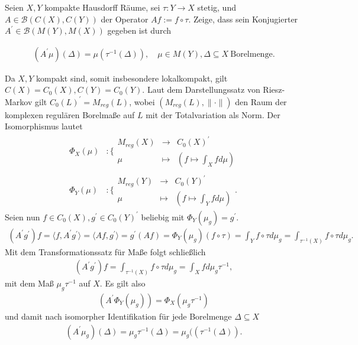 \begin{exercise}

Seien $X, Y$ kompakte Hausdorff Räume, sei $\tau: Y \to X$ stetig, und $A \in \mathcal{B}(C(X), C(Y))$ der Operator $A f := f \circ \tau$.
Zeige, dass sein Konjugierter $A^\prime \in \mathcal{B}(M(Y), M(X))$ gegeben ist durch

\begin{align*}
  (A^\prime \mu)(\Delta) = \mu(\tau^{-1}(\Delta)),
  \quad
  \mu \in M(Y), \Delta \subseteq X ~\text{Borelmenge}.
\end{align*}

\end{exercise}

\begin{solution}
Da $X,Y$ kompakt sind, somit insbesondere lokalkompakt, gilt $C(X) = C_0(X), C(Y) = C_0(Y)$.
Laut dem Darstellungssatz von Riesz-Markov gilt $C_0(L)^{\prime} = M_{reg}(L)$,
wobei $(M_{reg}(L), \|\cdot\|)$ den Raum der komplexen regulären Borelmaße auf $L$
mit der Totalvariation als Norm.
Der Isomorphismus lautet
\begin{align*}
  \Phi_X(\mu)&: \Bigg\{ \begin{matrix}
    M_{reg}(X) & \to & C_0(X)^{\prime} \\
    \mu & \mapsto & (f \mapsto \int_X f d\mu)
  \end{matrix} \\
  \Phi_Y(\mu)&: \Bigg\{ \begin{matrix}
    M_{reg}(Y) & \to & C_0(Y)^{\prime} \\
    \mu & \mapsto & (f \mapsto \int_Y f d\mu)
  \end{matrix}.
\end{align*}
Seien nun $f \in C_0(X), g^{\prime} \in C_0(Y)^{\prime}$ beliebig mit $\Phi_Y(\mu_g) = g^{\prime}$.
\begin{align*}
  (A^{\prime}g^{\prime})f = \langle f, A^{\prime}g^{\prime} \rangle = \langle A f, g^{\prime} \rangle
  = g^{\prime}(Af) = \Phi_Y(\mu_g)(f \circ \tau)
  = \int_Y f\circ \tau d\mu_g
  = \int_{\tau^{-1}(X)} f \circ \tau d\mu_g.
\end{align*}
Mit dem Transformationssatz für Maße folgt schließlich
\begin{align*}
  (A^{\prime}g^{\prime})f = \int_{\tau^{-1}(X)} f \circ \tau d\mu_g
  = \int_{X} f d\mu_g\tau^{-1},
\end{align*}
mit dem Maß $\mu_g\tau^{-1}$ auf $X$.
Es gilt also
\begin{align*}
  (A^{\prime}\Phi_Y(\mu_g)) = \Phi_X(\mu_g\tau^{-1})
\end{align*}
und damit nach isomorpher Identifikation für jede Borelmenge $\Delta \subseteq X$
\begin{align*}
  (A^{\prime}\mu_g)(\Delta) = \mu_g\tau^{-1}(\Delta) = \mu_g((\tau^{-1}(\Delta)).
\end{align*}
\end{solution}
